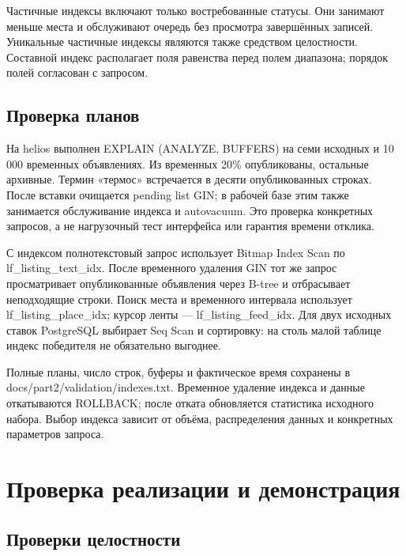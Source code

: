 Частичные индексы включают только востребованные статусы. Они занимают меньше места и обслуживают очередь без просмотра завершённых записей. Уникальные частичные индексы являются также средством целостности. Составной индекс располагает поля равенства перед полем диапазона; порядок полей согласован с запросом.

\FloatBarrier
{}
\subsection{Проверка планов}

На helios выполнен EXPLAIN (ANALYZE, BUFFERS) на семи исходных и 10 000 временных объявлениях. Из временных 20\% опубликованы, остальные архивные. Термин «термос» встречается в десяти опубликованных строках. После вставки очищается pending list GIN; в рабочей базе этим также занимается обслуживание индекса и autovacuum. Это проверка конкретных запросов, а не нагрузочный тест интерфейса или гарантия времени отклика.

С индексом полнотекстовый запрос использует Bitmap Index Scan по lf\_\allowbreak{}listing\_\allowbreak{}text\_\allowbreak{}idx. После временного удаления GIN тот же запрос просматривает опубликованные объявления через B-tree и отбрасывает неподходящие строки. Поиск места и временного интервала использует lf\_\allowbreak{}listing\_\allowbreak{}place\_\allowbreak{}idx; курсор ленты — lf\_\allowbreak{}listing\_\allowbreak{}feed\_\allowbreak{}idx. Для двух исходных ставок Postgre\allowbreak{}SQL выбирает Seq Scan и сортировку: на столь малой таблице индекс победителя не обязательно выгоднее.

Полные планы, число строк, буферы и фактическое время сохранены в docs/\allowbreak{}part2/\allowbreak{}validation/\allowbreak{}indexes.txt. Временное удаление индекса и данные откатываются ROLLBACK; после отката обновляется статистика исходного набора. Выбор индекса зависит от объёма, распределения данных и конкретных параметров запроса.

\clearpage
\section{Проверка реализации и демонстрация}

\FloatBarrier
{}
\subsection{Проверки целостности}

